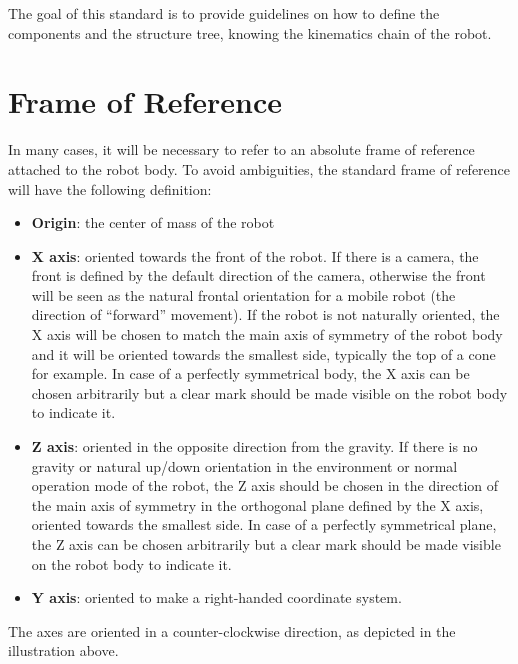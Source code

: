 \documentclass[a4paper]{article}
\newcommand\liststyleWWviiiNumxi{%
\renewcommand\labelitemi{[F0B7?]}
\renewcommand\labelitemii{o}
\renewcommand\labelitemiii{[F0A7?]}
\renewcommand\labelitemiv{[F0B7?]}
}
\begin{document}
{\sffamily
The goal of this standard is to provide guidelines on how to define the
components and the structure tree, knowing the kinematics chain of the
robot.}

\section[Frame of Reference]{ Frame of
Reference}
{\sffamily
In many cases, it will be necessary to refer to an absolute frame of
reference attached to the robot body. To avoid ambiguities, the
standard frame of reference will have the following definition:}



\begin{figure}

\end{figure}
\liststyleWWviiiNumxi
\begin{itemize}
\item {
\textsf{\textbf{Origin}}\textsf{: the center of mass of the robot}}
\end{itemize}
\liststyleWWviiiNumxi
\begin{itemize}
\item {
\textsf{\textbf{X axis}}\textsf{: oriented towards the front of the
robot. If there is a camera, the front is defined by the default
direction of the camera, otherwise the front will be seen as the
natural frontal orientation for a mobile robot (the direction of
“forward” movement). If the robot is not naturally oriented, the X axis
will be chosen to match the main axis of symmetry of the robot body and
it will be oriented towards the smallest side, typically the top of a
cone for example. }\textsf{In case of a perfectly symmetrical body, the
X axis can be chosen arbitrarily but a clear mark should be made
visible on the robot body to indicate it.}}
\end{itemize}
\liststyleWWviiiNumxi
\begin{itemize}
\item {
\textsf{\textbf{Z axis}}\textsf{: oriented in the opposite direction
from the gravity. If there is no gravity or natural up/down orientation
in the environment or normal operation mode of the robot, the Z axis
should be chosen in the direction of the main axis of symmetry in the
orthogonal plane defined by the X axis, oriented towards the smallest
side. In case of a perfectly symmetrical plane, the Z axis can be
chosen arbitrarily but a clear mark should be made visible on the robot
body to indicate it.}}
\end{itemize}
\liststyleWWviiiNumxi
\begin{itemize}
\item {
\textsf{\textbf{Y axis}}\textsf{: oriented to make a right-handed
coordinate system. }}
\end{itemize}
{\sffamily
The axes are oriented in a counter-clockwise direction, as depicted in
the illustration above.}
\end{document}
